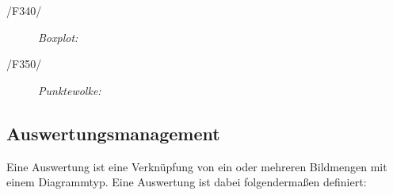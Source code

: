 \begin{description}
		\item[/F340/] \textit{Boxplot:}\par 
		\begin{figure}[htbp]
		 \centering
		\end{figure}


		\item[/F350/] \textit{Punktewolke:}\par		
		\begin{figure}[htbp]
		 \centering
		\end{figure}


	\end{description}

\subsection{Auswertungsmanagement}

\label{subsec:auswertungsmgmt}

	Eine Auswertung ist eine Verknüpfung von ein oder mehreren Bildmengen mit einem Diagrammtyp. Eine Auswertung ist dabei folgendermaßen definiert:

